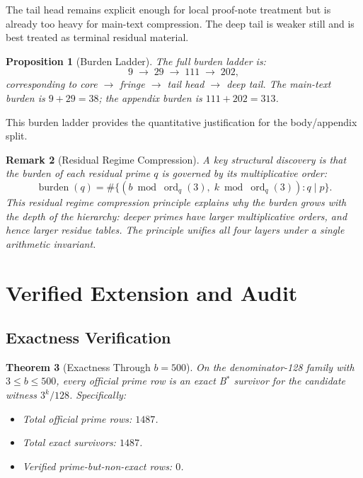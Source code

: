 \documentclass[11pt,letterpaper]{article}
\newtheorem{theorem}{Theorem}
\newtheorem{proposition}[theorem]{Proposition}
\newtheorem{remark}[theorem]{Remark}
\begin{document}
The tail head remains explicit enough for local proof-note treatment but is already too heavy for main-text compression.
The deep tail is weaker still and is best treated as terminal residual material.

\begin{proposition}[Burden Ladder]\label{prop:burden}
The full burden ladder is:
\begin{equation}
    9 \;\to\; 29 \;\to\; 111 \;\to\; 202,
\end{equation}
corresponding to core $\to$ fringe $\to$ tail head $\to$ deep tail.
The main-text burden is $9 + 29 = 38$; the appendix burden is $111 + 202 = 313$.
\end{proposition}

This burden ladder provides the quantitative justification for the body/appendix split.

\begin{remark}[Residual Regime Compression]
A key structural discovery is that the burden of each residual prime $q$ is governed by its multiplicative order:
\begin{equation}
    \operatorname{burden}(q) = \#\{(b \bmod \operatorname{ord}_q(3),\; k \bmod \operatorname{ord}_q(3)) : q \mid p\}.
\end{equation}
This \emph{residual regime compression principle} explains why the burden grows with the depth of the hierarchy: deeper primes have larger multiplicative orders, and hence larger residue tables. The principle unifies all four layers under a single arithmetic invariant.
\end{remark}

\section{Verified Extension and Audit}\label{sec:audit}

\subsection{Exactness Verification}

\begin{theorem}[Exactness Through $b = 500$]\label{thm:exact500}
On the denominator-128 family with $3 \leq b \leq 500$, every official prime row is an exact B$^\ast$ survivor for the candidate witness $3^k/128$.
Specifically:
\begin{itemize}
    \item Total official prime rows: $1487$.
    \item Total exact survivors: $1487$.
    \item Verified prime-but-non-exact rows: $0$.
\end{itemize}
\end{theorem}
\end{document}
